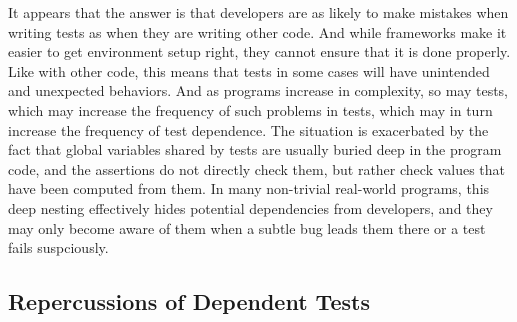 It appears that the answer is that developers are as likely
to make mistakes when writing tests as when they are writing other code.
And while frameworks make it easier to get environment setup right, 
they cannot ensure that it is done properly. 
Like with other code, this means that tests in some cases will have
unintended and unexpected behaviors.  And as programs increase in complexity,
so may tests, which may increase the frequency of such problems in tests,
which may in turn increase the frequency of test dependence.
The situation is exacerbated by the fact that global variables shared by tests
are usually buried deep in the program code, and the assertions
do not directly check them,
but rather check values that have been computed from
them. In many non-trivial real-world programs, this
deep nesting effectively hides potential dependencies from developers,
and they may only become aware of them when a subtle bug leads them
there or a test fails suspciously.



\subsection{Repercussions of Dependent Tests}




